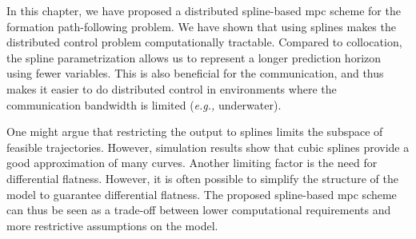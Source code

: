 In this chapter, we have proposed a distributed spline-based \gls{mpc} scheme for the formation path-following problem.
We have shown that using splines makes the distributed control problem computationally tractable.
Compared to collocation, the spline parametrization allows us to represent a longer prediction horizon using fewer variables.    
This is also beneficial for the communication, and thus makes it easier to do distributed control in environments where the communication bandwidth is limited (\emph{e.g.,} underwater).

One might argue that restricting the output to splines limits the subspace of feasible trajectories.
However, simulation results show that cubic splines provide a good approximation of many curves.
Another limiting factor is the need for differential flatness.
However, it is often possible to simplify the structure of the model to guarantee differential flatness.        
The proposed spline-based \gls{mpc} scheme can thus be seen as a trade-off between lower computational requirements and more restrictive assumptions on the model.
